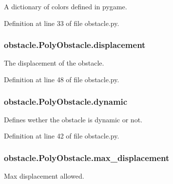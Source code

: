 A dictionary of colors defined in pygame. 



Definition at line 33 of file obstacle.\-py.

\hypertarget{classobstacle_1_1PolyObstacle_af943155354bdf61ff754752819ff4013}{
\subsubsection[{displacement}]{\setlength{\rightskip}{0pt plus 5cm}obstacle.\-Poly\-Obstacle.\-displacement}}\label{classobstacle_1_1PolyObstacle_af943155354bdf61ff754752819ff4013}


The displacement of the obstacle. 



Definition at line 48 of file obstacle.\-py.

\hypertarget{classobstacle_1_1PolyObstacle_a9667fa3bc98877420e2af4bb6d617576}{
\subsubsection[{dynamic}]{\setlength{\rightskip}{0pt plus 5cm}obstacle.\-Poly\-Obstacle.\-dynamic}}\label{classobstacle_1_1PolyObstacle_a9667fa3bc98877420e2af4bb6d617576}


Defines wether the obstacle is dynamic or not. 



Definition at line 42 of file obstacle.\-py.

\hypertarget{classobstacle_1_1PolyObstacle_a01bca757590d23eeee5c864472a7fbe6}{
\subsubsection[{max\-\_\-displacement}]{\setlength{\rightskip}{0pt plus 5cm}obstacle.\-Poly\-Obstacle.\-max\-\_\-displacement}}\label{classobstacle_1_1PolyObstacle_a01bca757590d23eeee5c864472a7fbe6}


Max displacement allowed. 



